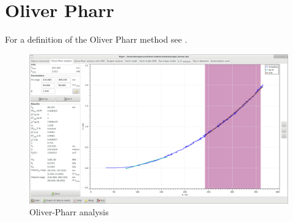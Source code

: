 \section{Oliver Pharr}
For a definition of the Oliver Pharr method see \cite{OliverPharr}. \\

\begin{figure}[ht]
  \centering
  \includegraphics[width=\textwidth]{images/screen-op}
  \caption{Oliver-Pharr analysis}
\end{figure}

